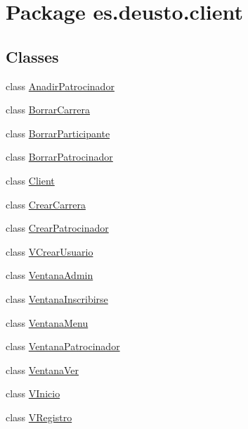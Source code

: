 \hypertarget{namespacees_1_1deusto_1_1client}{}\section{Package es.\+deusto.\+client}
\label{namespacees_1_1deusto_1_1client}
\subsection*{Classes}
\begin{DoxyCompactItemize}
\item 
class \mbox{\hyperlink{classes_1_1deusto_1_1client_1_1_anadir_patrocinador}{Anadir\+Patrocinador}}
\item 
class \mbox{\hyperlink{classes_1_1deusto_1_1client_1_1_borrar_carrera}{Borrar\+Carrera}}
\item 
class \mbox{\hyperlink{classes_1_1deusto_1_1client_1_1_borrar_participante}{Borrar\+Participante}}
\item 
class \mbox{\hyperlink{classes_1_1deusto_1_1client_1_1_borrar_patrocinador}{Borrar\+Patrocinador}}
\item 
class \mbox{\hyperlink{classes_1_1deusto_1_1client_1_1_client}{Client}}
\item 
class \mbox{\hyperlink{classes_1_1deusto_1_1client_1_1_crear_carrera}{Crear\+Carrera}}
\item 
class \mbox{\hyperlink{classes_1_1deusto_1_1client_1_1_crear_patrocinador}{Crear\+Patrocinador}}
\item 
class \mbox{\hyperlink{classes_1_1deusto_1_1client_1_1_v_crear_usuario}{V\+Crear\+Usuario}}
\item 
class \mbox{\hyperlink{classes_1_1deusto_1_1client_1_1_ventana_admin}{Ventana\+Admin}}
\item 
class \mbox{\hyperlink{classes_1_1deusto_1_1client_1_1_ventana_inscribirse}{Ventana\+Inscribirse}}
\item 
class \mbox{\hyperlink{classes_1_1deusto_1_1client_1_1_ventana_menu}{Ventana\+Menu}}
\item 
class \mbox{\hyperlink{classes_1_1deusto_1_1client_1_1_ventana_patrocinador}{Ventana\+Patrocinador}}
\item 
class \mbox{\hyperlink{classes_1_1deusto_1_1client_1_1_ventana_ver}{Ventana\+Ver}}
\item 
class \mbox{\hyperlink{classes_1_1deusto_1_1client_1_1_v_inicio}{V\+Inicio}}
\item 
class \mbox{\hyperlink{classes_1_1deusto_1_1client_1_1_v_registro}{V\+Registro}}
\end{DoxyCompactItemize}
